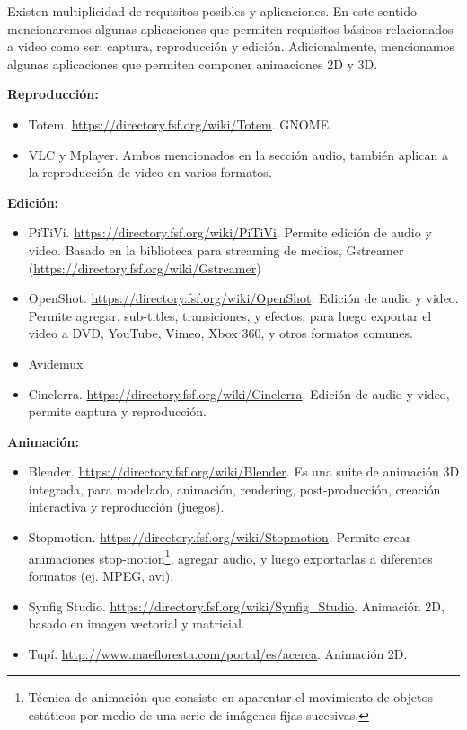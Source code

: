 \documentclass[12pt]{article}
\begin{document}
Existen multiplicidad de requisitos posibles y aplicaciones. En este sentido 
mencionaremos algunas aplicaciones que permiten requisitos básicos relacionados
a video como ser: captura, reproducción y edición. Adicionalmente, mencionamos 
algunas aplicaciones que permiten componer animaciones 2D y 3D. 

{\bf Reproducción:}
\begin{itemize}
\item Totem.   \url{https://directory.fsf.org/wiki/Totem}. GNOME. 
\item VLC y Mplayer.  Ambos mencionados en la sección audio, también aplican 
a la reproducción de video en varios formatos.  
\end{itemize}

{\bf Edición:}
\begin{itemize}
\item PiTiVi. \url{https://directory.fsf.org/wiki/PiTiVi}.
Permite edición de audio y video. Basado en la biblioteca para
streaming de medios, Gstreamer (\url{https://directory.fsf.org/wiki/Gstreamer})
\item OpenShot. \url{https://directory.fsf.org/wiki/OpenShot}. Edición 
de audio y video. Permite agregar. sub-titles, transiciones, y efectos, para 
luego exportar el video a DVD, YouTube, Vimeo, Xbox 360, y otros formatos comunes.
\item Avidemux 
\item Cinelerra. \url{https://directory.fsf.org/wiki/Cinelerra}. Edición de audio
y video, permite captura y reproducción. 
\end{itemize}


{\bf Animación:}
\begin{itemize}
\item Blender. \url{https://directory.fsf.org/wiki/Blender}. Es una suite de
animación  3D integrada, para modelado, animación, rendering, post-producción, creación 
interactiva y reproducción (juegos). 
\item Stopmotion. \url{https://directory.fsf.org/wiki/Stopmotion}. Permite
crear animaciones stop-motion\footnote{Técnica de animación que consiste 
en aparentar el movimiento de objetos estáticos por medio de una serie de 
imágenes fijas sucesivas.}, agregar audio, y luego exportarlas a 
diferentes formatos (ej. MPEG, avi). 
\item Synfig Studio. \url{https://directory.fsf.org/wiki/Synfig_Studio}. 
Animación 2D, basado en imagen vectorial y matricial. 
\item Tupí. \url{http://www.maefloresta.com/portal/es/acerca}. Animación
2D. 
\end{itemize}
\end{document}
